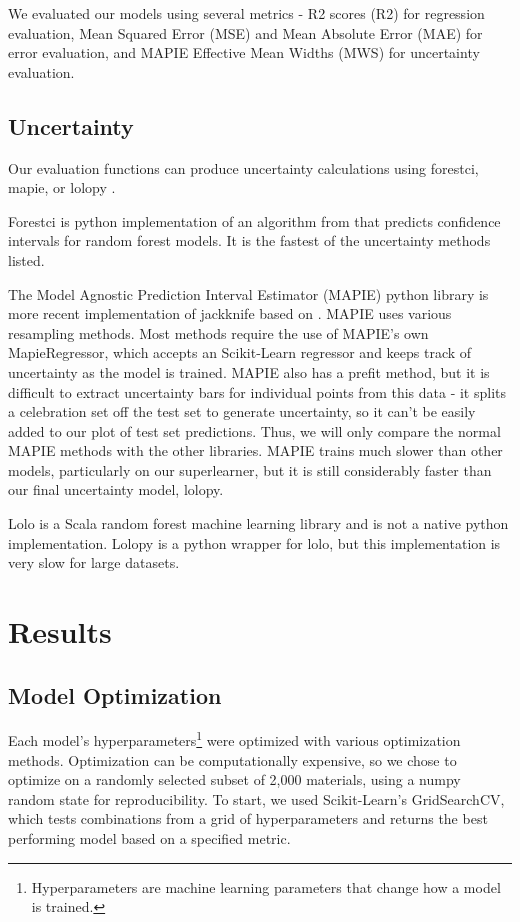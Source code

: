 \documentclass[twocolumn, nofootinbib, secnumarabic, amssymb, nobibnotes, aps, prd]{revtex4-2}
\begin{document}
We evaluated our models using several metrics - R2 scores (R2) for regression evaluation, Mean Squared Error (MSE) and Mean Absolute Error (MAE) for error evaluation, and MAPIE Effective Mean Widths (MWS) for uncertainty evaluation.

\subsection{Uncertainty}\label{sec:uncertainty}
Our evaluation functions can produce uncertainty calculations using forestci, mapie, or lolopy \cite{Polimis2017, Taquet2022, Hutchinson2022}. 

Forestci is python implementation of an algorithm from \cite{Wager2014} that predicts confidence intervals for random forest models. It is the fastest of the uncertainty methods listed. 

The Model Agnostic Prediction Interval Estimator (MAPIE) python library is more recent implementation of jackknife based on \cite{Foygel2020}. MAPIE uses various resampling methods. Most methods require the use of MAPIE's own MapieRegressor, which accepts an Scikit-Learn regressor and keeps track of uncertainty as the model is trained. MAPIE also has a prefit method, but it is difficult to extract uncertainty bars for individual points from this data - it splits a celebration set off the test set to generate uncertainty, so it can't be easily added to our plot of test set predictions. Thus, we will only compare the normal MAPIE methods with the other libraries. MAPIE trains much slower than other models, particularly on our superlearner, but it is still considerably faster than our final uncertainty model, lolopy.

Lolo is a Scala random forest machine learning library and is not a native python implementation. Lolopy is a python wrapper for lolo, but this implementation is very slow for large datasets. 

\section{Results}
\subsection{Model Optimization}
Each model's hyperparameters\footnote{Hyperparameters are machine learning parameters that change how a model is trained.} were optimized with various optimization methods. Optimization can be computationally expensive, so we chose to optimize on a randomly selected subset of 2,000 materials, using a numpy random state for reproducibility. To start, we used Scikit-Learn's GridSearchCV, which tests combinations from a grid of hyperparameters and returns the best performing model based on a specified metric. 
\end{document}
